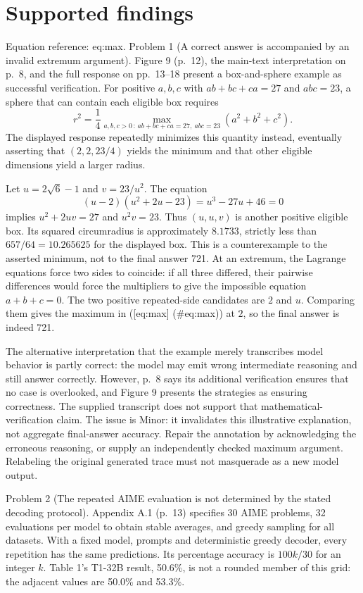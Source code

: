 \documentclass[10pt]{article}
\begin{document}
\section*{Supported findings}
Equation reference: eq:max. Problem 1 (A correct answer is accompanied by an invalid extremum argument).  Figure 9 (p. 12), the main-text interpretation on p. 8, and the full response on pp. 13–18 present a box-and-sphere example as successful verification. For positive \(a,b,c\) with \(ab+bc+ca=27\) and \(abc=23\), a sphere that can contain each eligible box requires \[
 r^2=\frac14\max_{a,b,c>0\,:\,ab+bc+ca=27,\ abc=23}(a^2+b^2+c^2).\] The displayed response repeatedly minimizes this quantity instead, eventually asserting that \((2,2,23/4)\) yields the minimum and that other eligible dimensions yield a larger radius.\par
Let \(u=2\sqrt6-1\) and \(v=23/u^2\). The equation \[(u-2)(u^2+2u-23)=u^3-27u+46=0\] implies \(u^2+2uv=27\) and \(u^2v=23\). Thus \((u,u,v)\) is another positive eligible box. Its squared circumradius is approximately \(8.1733\), strictly less than \(657/64=10.265625\) for the displayed box. This is a counterexample to the asserted minimum, not to the final answer 721. At an extremum, the Lagrange equations force two sides to coincide: if all three differed, their pairwise differences would force the multipliers to give the impossible equation \(a+b+c=0\). The two positive repeated-side candidates are \(2\) and \(u\). Comparing them gives the maximum in ([eq:max] (\#eq:max)) at \(2\), so the final answer is indeed 721.\par
The alternative interpretation that the example merely transcribes model behavior is partly correct: the model may emit wrong intermediate reasoning and still answer correctly. However, p. 8 says its additional verification ensures that no case is overlooked, and Figure 9 presents the strategies as ensuring correctness. The supplied transcript does not support that mathematical-verification claim. The issue is Minor: it invalidates this illustrative explanation, not aggregate final-answer accuracy. Repair the annotation by acknowledging the erroneous reasoning, or supply an independently checked maximum argument. Relabeling the original generated trace must not masquerade as a new model output.\par
Problem 2 (The repeated AIME evaluation is not determined by the stated decoding protocol).  Appendix A.1 (p. 13) specifies 30 AIME problems, 32 evaluations per model to obtain stable averages, and greedy sampling for all datasets. With a fixed model, prompts and deterministic greedy decoder, every repetition has the same predictions. Its percentage accuracy is \(100k/30\) for an integer \(k\). Table 1’s T1-32B result, 50.6\%, is not a rounded member of this grid: the adjacent values are 50.0\% and 53.3\%.\par
\end{document}
